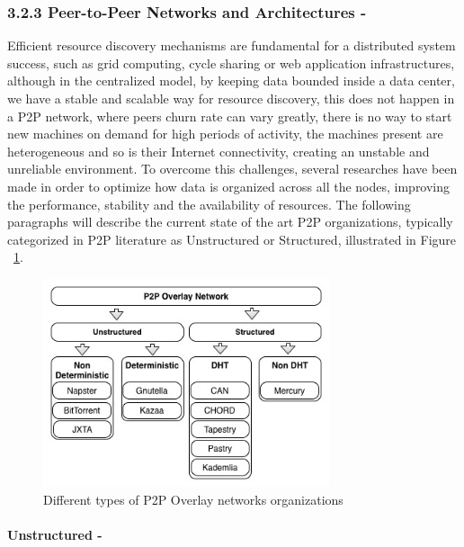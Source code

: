 \subsubsection{3.2.3 Peer-to-Peer Networks and Architectures -}  
Efficient resource discovery mechanisms are fundamental for a distributed system success, such as grid computing, cycle sharing or web application infrastructures\cite{Ranjan2006}, although in the centralized model, by keeping data bounded inside a data center, we have a stable and scalable way for resource discovery, this does not happen in a P2P network, where peers churn rate can vary greatly, there is no way to start new machines on demand for high periods of activity, the machines present are heterogeneous and so is their Internet connectivity, creating an unstable and unreliable environment. To overcome this challenges, several researches have been made in order to optimize how data is organized across all the nodes, improving the performance, stability and the availability of resources. The following paragraphs will describe the current state of the art P2P organizations, typically categorized in P2P literature as Unstructured or Structured\cite{Milojicic2003}, illustrated in Figure ~\ref{fig:Different types of P2P Overlay networks organizations}.

\begin{figure}[bh!]
  \begin{center}
    \includegraphics[width=0.75\textwidth]{./img/p2porganizations.jpg}
  \end{center}
  \caption{Different types of P2P Overlay networks organizations}
  \label{fig:Different types of P2P Overlay networks organizations}
\end{figure}


\paragraph{\textbf{Unstructured -}} %
\label{par:Unstructured}

